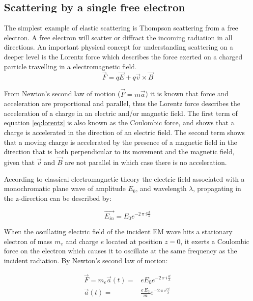 \subsection{Scattering by a single free electron}
The simplest example of elastic scattering is Thompson scattering from a free electron. A free electron will scatter or diffract the incoming radiation in all directions. An important physical concept for understanding scattering on a deeper level is the Lorentz force which describes the force exerted on a charged particle travelling in a electromagnetic field. 
\begin{equation}\label{eq:lorentz}
\vec{F} = q\vec{E} + q\vec{v}\times\vec{B}
\end{equation} 

From Newton's second law of motion ($\vec{F} = m \vec{a}$) it is known that force and acceleration are
proportional and parallel, thus the Lorentz force describes the acceleration of a charge in an electric and/or magnetic field. The first term of equation \ref{eq:lorentz} is also known as the Coulombic force, and shows that a charge is accelerated in the direction of an electric field. The second term shows that a moving charge is accelerated by the presence of a magnetic field in the direction that is both perpendicular to its movement and the magnetic field, given that $\vec{v}$ and $\vec{B}$ are not parallel in which case there is no acceleration.

According to classical electromagnetic theory the electric field associated with a monochromatic plane wave of amplitude $E_0$, and wavelength $\lambda$, propagating in the z-direction can be described by: 

\begin{equation}\label{eq:plane_wave}
\vec{E_{in}} = E_0 e^{-2\,\pi\ i \frac{ c t }{\lambda}}
\end{equation} 

When the oscillating electric field of the incident EM wave hits a stationary electron of mass $m_e$ and charge $e$ located at position $z = 0$, it exerts a Coulombic force on the electron which causes it to oscillate at the same frequency as the incident radiation. By Newton's second law of motion:

\begin{align}\label{eq:motion_single}
\vec{F} = m_e \vec{a}(t) =& e E_0 e^{-2\,\pi\ i \frac{ c t}{\lambda}} \\
\vec{a}(t) =& \frac{e\,E_0}{m} e^{-2\,\pi\ i \frac{c\,t}{\lambda}}
\end{align}

